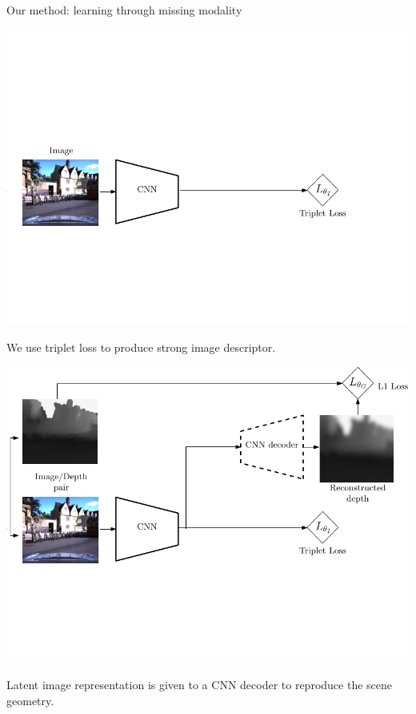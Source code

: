 \begin{frame}{Our method: learning through missing modality}
	\only<1>
	{
	\begin{minipage}{0.6\linewidth}
		\centering
		\includegraphics[width=\linewidth]{vect/method/fig3/1}	
	\end{minipage}\hfill
	\begin{minipage}{0.3\linewidth}
		\raggedright
		We use triplet loss to produce strong image descriptor.
	\end{minipage}		
	}
	{
	\begin{minipage}{0.6\linewidth}
		\centering
		\includegraphics[width=\linewidth]{vect/method/fig3/2}	
	\end{minipage}\hfill
	\begin{minipage}{0.3\linewidth}
		\raggedright
		Latent image representation is given to a CNN decoder to reproduce the scene geometry.\\
		\vspace{0.5cm}
		

\end{minipage}}
\end{frame}
